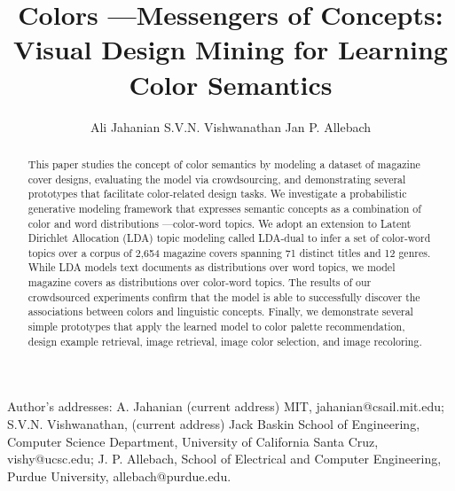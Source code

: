 \documentclass[prodmode,acmtochi]{acmsmall}
\begin{document}

\title{Colors ---Messengers of Concepts: Visual Design Mining for Learning Color Semantics}

\author{Ali Jahanian
S.V.N. Vishwanathan
Jan P. Allebach
}

\begin{abstract}
This paper studies the concept of color semantics by modeling a dataset of magazine cover designs, evaluating the model via crowdsourcing, and demonstrating several prototypes that facilitate color-related design tasks. We investigate a probabilistic generative modeling framework that expresses semantic concepts as a combination of color and word distributions ---color-word topics. We adopt an extension to Latent Dirichlet Allocation (LDA) topic modeling called LDA-dual to infer a set of color-word topics over a corpus of 2,654 magazine covers spanning 71 distinct titles and 12 genres. While LDA models text documents as distributions over word topics, we model magazine covers as distributions over color-word topics. The results of our crowdsourced experiments confirm that the model is able to successfully discover the associations between colors and linguistic concepts. Finally, we demonstrate several simple prototypes that apply the learned model to color palette recommendation, design example retrieval, image retrieval, image color selection, and image recoloring.

\end{abstract}





\begin{bottomstuff}

Author's addresses: A. Jahanian (current address) MIT, jahanian@csail.mit.edu; S.V.N. Vishwanathan, (current address) Jack Baskin School of Engineering, Computer Science Department, University of California Santa Cruz, vishy@ucsc.edu; J. P. Allebach, School of Electrical and Computer Engineering, Purdue University, allebach@purdue.edu.
\end{bottomstuff}
\end{document}
